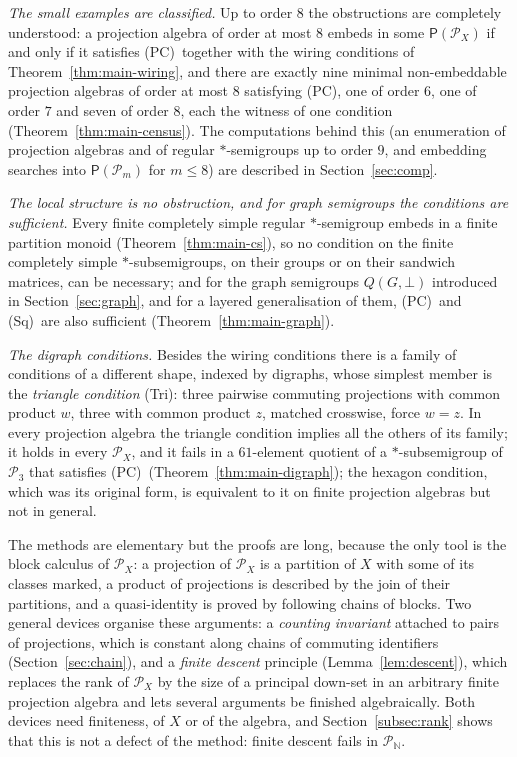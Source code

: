 \documentclass[11pt]{amsart}
\theoremstyle{definition}
\renewcommand{\P}{\mathcal{P}}      %
\newcommand{\PA}{\mathsf{P}}         %
\newcommand{\Qone}{\textup{(PC)}}     %
\newcommand{\Tri}{\textup{(Tri)}}
\newcommand{\Wire}{\textup{(Sq)}}      %
\begin{document}
\emph{The small examples are classified.} Up to order $8$ the obstructions are completely understood: a projection algebra of order at most $8$ embeds in some $\PA(\P_X)$ if and only if it satisfies \Qone\ together with the wiring conditions of Theorem~\ref{thm:main-wiring}, and there are exactly nine minimal non-embeddable projection algebras of order at most $8$ satisfying \Qone, one of order $6$, one of order $7$ and seven of order $8$, each the witness of one condition (Theorem~\ref{thm:main-census}). The computations behind this (an enumeration of projection algebras and of regular $*$-semigroups up to order $9$, and embedding searches into $\PA(\P_m)$ for $m\le8$) are described in Section~\ref{sec:comp}.

\emph{The local structure is no obstruction, and for graph semigroups the conditions are sufficient.} Every finite completely simple regular $*$-semigroup embeds in a finite partition monoid (Theorem~\ref{thm:main-cs}), so no condition on the finite completely simple $*$-subsemigroups, on their groups or on their sandwich matrices, can be necessary; and for the graph semigroups $Q(G,\bot)$ introduced in Section~\ref{sec:graph}, and for a layered generalisation of them, \Qone\ and \Wire\ are also sufficient (Theorem~\ref{thm:main-graph}).

\emph{The digraph conditions.} Besides the wiring conditions there is a family of conditions of a different shape, indexed by digraphs, whose simplest member is the \emph{triangle condition} \Tri: three pairwise commuting projections with common product $w$, three with common product $z$, matched crosswise, force $w=z$. In every projection algebra the triangle condition implies all the others of its family; it holds in every $\P_X$, and it fails in a $61$-element quotient of a $*$-subsemigroup of $\P_3$ that satisfies \Qone\ (Theorem~\ref{thm:main-digraph}); the hexagon condition, which was its original form, is equivalent to it on finite projection algebras but not in general.

The methods are elementary but the proofs are long, because the only tool is the block calculus of $\P_X$: a projection of $\P_X$ is a partition of $X$ with some of its classes marked, a product of projections is described by the join of their partitions, and a quasi-identity is proved by following chains of blocks. Two general devices organise these arguments: a \emph{counting invariant} attached to pairs of projections, which is constant along chains of commuting identifiers (Section~\ref{sec:chain}), and a \emph{finite descent} principle (Lemma~\ref{lem:descent}), which replaces the rank of $\P_X$ by the size of a principal down-set in an arbitrary finite projection algebra and lets several arguments be finished algebraically. Both devices need finiteness, of $X$ or of the algebra, and Section~\ref{subsec:rank} shows that this is not a defect of the method: finite descent fails in $\P_{\mathbb N}$.
\end{document}
